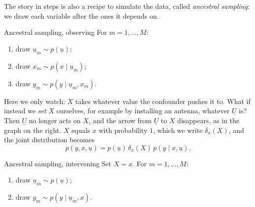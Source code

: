 \documentclass[a4paper,12pt,oneside]{report}
\begin{document}
\begin{center}
\end{center}

The story in steps is also a recipe to simulate the data, called
\emph{ancestral sampling}: we draw each variable after the ones it depends
on.

\begin{framedalgo}{Ancestral sampling, observing}\label{alg:ancestral-observe}
For $m=1,\ldots,M$:
\begin{enumerate}
\item draw $\underline{u}_m\sim p(\underline{u})$;
\item draw $x_m\sim p(x\mid\underline{u}_m)$;
\item draw $y_m\sim p(y\mid\underline{u}_m,x_m)$.
\end{enumerate}
\end{framedalgo}

Here we only watch: $X$ takes whatever value the confounder pushes it to.
What if instead we \emph{set} $X$ ourselves, for example by installing an
antenna, whatever $\underline{U}$ is? Then $\underline{U}$ no longer acts on $X$, and the
arrow from $\underline{U}$ to $X$ disappears, as in the graph on the right.
$X$ equals $x$ with probability $1$, which we write $\delta_x(X)$, and the
joint distribution becomes
\[
p(y,x,\underline{u})=p(\underline{u})\,\delta_x(X)\,p(y\mid x,\underline{u}).
\]

\begin{framedalgo}{Ancestral sampling, intervening}\label{alg:ancestral-set}
Set $X=x$. For $m=1,\ldots,M$:
\begin{enumerate}
\item draw $\underline{u}_m\sim p(\underline{u})$;
\item draw $y_m\sim p(y\mid\underline{u}_m,x)$.
\end{enumerate}
\end{framedalgo}
\end{document}
